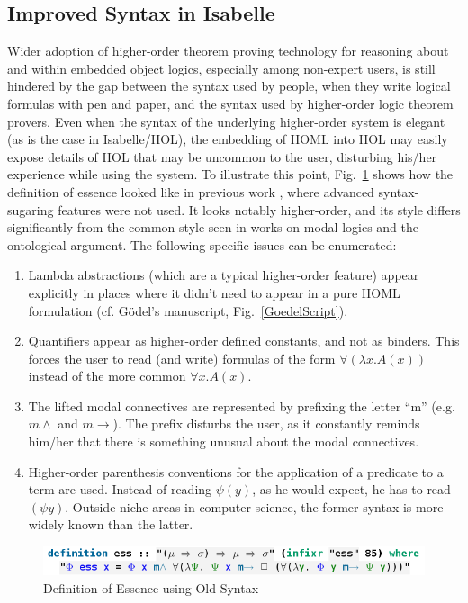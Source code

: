 \documentclass{article}
\newcommand{\imp}{\rightarrow}
\begin{document}
\subsection{Improved Syntax in Isabelle}

Wider adoption of higher-order theorem proving technology for reasoning about and within embedded object logics, especially among non-expert users, is still hindered by the gap between the syntax used by people, when they write logical formulas with pen and paper, and the syntax used by higher-order logic theorem provers. Even when the syntax of the underlying higher-order system is elegant (as is the case in Isabelle/HOL), the embedding of HOML into HOL may easily expose details of HOL that may be uncommon to the user, disturbing his/her experience while using the system. To illustrate this point, Fig.~\ref{UglyEssence} shows how the definition of essence looked like in previous work \cite{ArchiveFormalProofsGoedelGod}, where advanced syntax-sugaring features were not used. It looks notably higher-order, and its style differs significantly from the common style seen in works on modal logics and the ontological argument. The following specific issues can be enumerated:
\begin{enumerate}
\item Lambda abstractions (which are a typical higher-order feature) appear explicitly in places where it didn't need to appear in a pure HOML formulation (cf. G\"odel's manuscript, Fig.~\ref{GoedelScript}).
\item Quantifiers appear as higher-order defined constants, and not as binders. This forces the user to read (and write) formulas of the form $\forall (\lambda x. A(x))$ instead of the more common $\forall x. A(x)$.
\item The lifted modal connectives are represented by prefixing the letter ``m'' (e.g. $m\wedge$ and $m\imp$). The prefix disturbs the user, as it constantly reminds him/her that there is something unusual about the modal connectives.
\item Higher-order parenthesis conventions for the application of a predicate to a term are used. 
Instead of reading $\psi(y)$, as he would expect, he has to read $(\psi y)$. Outside niche areas in computer science, the former syntax is more widely known than the latter.
\end{enumerate}


\begin{figure}
\centerline{\includegraphics[width=\columnwidth]{./Images/UglyEssence.png}}
\caption{ Definition of Essence using Old Syntax } \label{UglyEssence}
\end{figure}
\end{document}
